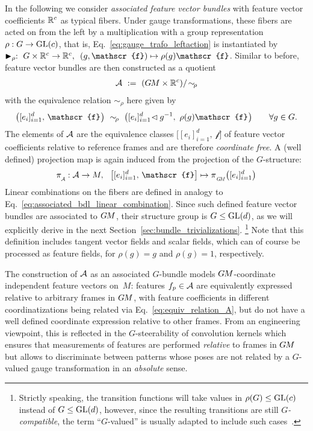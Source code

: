 In the following we consider \emph{associated feature vector bundles} with feature vector coefficients $\mathbb{R}^c$ as typical fibers.
Under gauge transformations, these fibers are acted on from the left by a multiplication with a group representation $\rho:G\to\operatorname{GL}(c)$, that is, Eq.~\eqref{eq:gauge_trafo_leftaction} is instantiated by $\blacktriangleright_\rho:\ {G\times\R^c \to \R^c,}\ \ {(g,\mathscr{f}) \mapsto \rho(g)\mathscr{f}}$.
Similar to before, feature vector bundles are then constructed as a quotient
\begin{align}\label{eq:associated_bundle_def}
    \mathcal{A}\ :=\ (G\mkern-1.4muM\times\mathbb{R}^c)/\!\sim_{\!\rho}
\end{align}
with the equivalence relation $\sim_{\!\rho}$ here given by
\begin{align}\label{eq:equiv_relation_A}
    \big([e_i]_{i=1}^d,\, \mathscr{f} \mkern1mu\big)\ \sim_{\!\rho}\ 
    \big([e_i]_{i=1}^d\!\lhd g^{-1},\ \rho(g) \mathscr{f} \mkern1mu\big) \qquad\forall g\in G.
\end{align}
The elements of $\mathcal{A}$ are the equivalence classes $\big[[e_i]_{i=1}^d,\ \mathscr{f}\big]$ of feature vector coefficients relative to reference frames and are therefore \emph{coordinate free}.
A (well defined) projection map is again induced from the projection of the $G$-structure:
\begin{align}\label{eq:associated_A_proj}
    \piA: \A \to M,\ \ 
    \big[[e_i]_{i=1}^d,\,\mathscr{f}\big] \mapsto \piGM \big( [e_i]_{i=1}^d \big)
\end{align}
Linear combinations on the fibers are defined in analogy to Eq.~\eqref{eq:associated_bdl_linear_combination}.
Since such defined feature vector bundles are associated to $G\mkern-1.4muM$, their structure group is $G\leq\operatorname{GL}(d)$, as we will explicitly derive in the next Section~\ref{sec:bundle_trivializations}.%
\footnote{
    Strictly speaking, the transition functions will take values in $\rho(G) \leq \operatorname{GL}(c)$ instead of $G \leq \operatorname{GL}(d)$, however, since the resulting transitions are still $G$\emph{-compatible}, the term ``$G$-valued'' is usually adapted to include such cases~\cite{wendlLectureNotesBundles2008}.
}
Note that this definition includes tangent vector fields and scalar fields, which can of course be processed as feature fields, for $\rho(g)=g$ and $\rho(g)=1$, respectively.


The construction of $\mathcal{A}$ as an associated $G$-bundle models $G\mkern-1.4muM$-coordinate independent feature vectors on~$M$:
features $f_p \in \mathcal{A}$ are equivalently expressed relative to arbitrary frames in $G\mkern-1.4muM$, with feature coefficients in different coordinatizations being related via Eq.~\eqref{eq:equiv_relation_A}, but do not have a well defined coordinate expression relative to other frames.
From an engineering viewpoint, this is reflected in the $G$-steerability of convolution kernels which ensures that measurements of features are performed \emph{relative} to frames in $G\mkern-1.4muM$ but allows to discriminate between patterns whose poses are not related by a $G$-valued gauge transformation in an \emph{absolute} sense.



